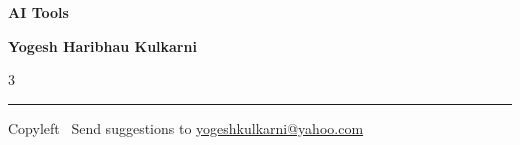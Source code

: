 
\graphicspath{{images/}}

\footnotesize


\begin{center}
{\Large{\textbf{AI Tools}}}  

\textbf{Yogesh Haribhau Kulkarni}
\end{center}

\begin{multicols}{3}

\end{multicols}

\rule{\linewidth}{0.25pt}
\scriptsize
Copyleft \textcopyleft\  Send suggestions to 
\href{http://www.yogeshkulkarni.com}{yogeshkulkarni@yahoo.com}


